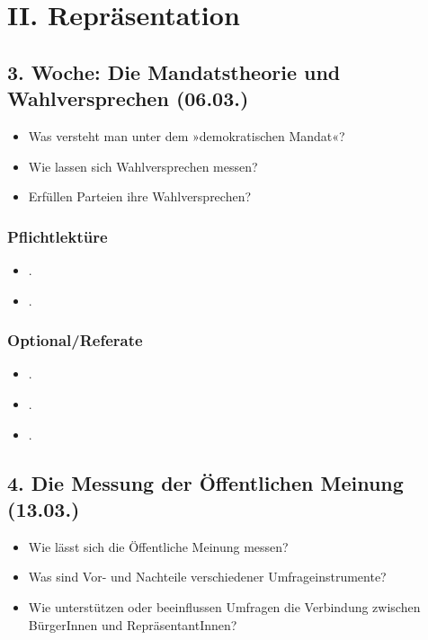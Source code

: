 \documentclass[abstract=on,parskip=full,headings=standardclasses,fontsize=11pt,paper=a4]{scrartcl}
\begin{document}
\section{II. Repräsentation}

\subsection{3. Woche: Die Mandatstheorie und Wahlversprechen (06.03.)}

\begin{itemize}
\renewcommand\labelitemi{--}
\item Was versteht man unter dem »demokratischen Mandat«?
\item Wie lassen sich Wahlversprechen messen?
\item Erfüllen Parteien ihre Wahlversprechen?
\end{itemize}

\subsubsection*{Pflichtlektüre}
\begin{itemize}
\item {}.
\item {}.
\end{itemize}

\subsubsection*{Optional/Referate}
\begin{itemize}
\item {}.
\item {}.
\item {}.
\end{itemize}


\subsection{4. Die Messung der Öffentlichen Meinung (13.03.)}

\begin{itemize}
\renewcommand\labelitemi{--}
\item Wie lässt sich die Öffentliche Meinung messen?
\item Was sind Vor- und Nachteile verschiedener Umfrageinstrumente?
\item Wie unterstützen oder beeinflussen Umfragen die Verbindung zwischen BürgerInnen und RepräsentantInnen?
\end{itemize}
\end{document}
